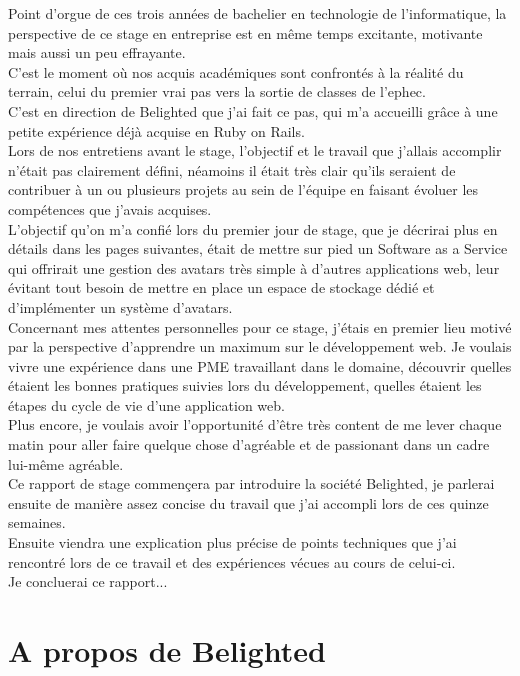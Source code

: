 \documentclass{report}
\begin{document}
  Point d'orgue de ces trois années de bachelier en technologie de l'informatique, la perspective de ce stage en entreprise
  est en même temps excitante, motivante mais aussi un peu effrayante.\\
  C'est le moment où nos acquis académiques sont confrontés à la réalité du terrain, celui du premier vrai pas vers la sortie
  de classes de l'ephec.\\

  C'est en direction de Belighted que j'ai fait ce pas, qui m'a accueilli grâce à une petite expérience déjà acquise en Ruby on Rails.\\
  Lors de nos entretiens avant le stage, l'objectif et le travail que j'allais accomplir n'était pas clairement défini, néamoins il était
  très clair qu'ils seraient de contribuer à un ou plusieurs projets au sein de l'équipe en faisant évoluer les compétences que j'avais acquises.\\
  L'objectif qu'on m'a confié lors du premier jour de stage, que je décrirai plus en détails dans les pages suivantes, était de mettre sur pied un Software as a
  Service qui offrirait une gestion des avatars très simple
  à d'autres applications web, leur évitant tout besoin de mettre en place un espace de stockage dédié et d'implémenter un
  système d'avatars.\\

  Concernant mes attentes personnelles pour ce stage, j'étais en premier lieu motivé par la perspective d'apprendre un maximum
  sur le développement web. Je voulais vivre une expérience dans une PME travaillant dans le domaine, découvrir quelles étaient les bonnes
  pratiques suivies lors du développement, quelles étaient les étapes du cycle de vie d'une application web.\\
  Plus encore, je voulais avoir l'opportunité d'être très content de me lever chaque matin pour aller faire quelque chose d'agréable et de passionant
  dans un cadre lui-même agréable.\\

  Ce rapport de stage commençera par introduire la société Belighted, je parlerai ensuite de manière assez concise du travail que j'ai accompli lors de ces quinze semaines.\\
  Ensuite viendra une explication plus précise de points techniques que j'ai rencontré lors de ce travail et des expériences vécues au cours de celui-ci.\\
  Je concluerai ce rapport...


\chapter{A propos de Belighted}
\end{document}
